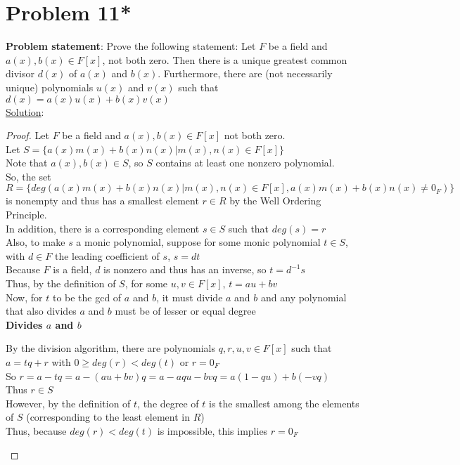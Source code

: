 \documentclass{article} %
\begin{document}
\section*{Problem 11*}
\textbf{Problem statement}: Prove the following statement: Let $F$ be a field and $a(x),b(x) \in F[x]$, not both zero.  Then there is a unique greatest common divisor $d(x)$ of $a(x)$ and $b(x)$.  Furthermore, there are (not necessarily unique) polynomials $u(x)$ and $v(x)$ such that $d(x) = a(x)u(x) + b(x)v(x)$
\\

\underline{Solution}: 
\begin{addmargin}[1em]{0em}
\begin{proof}
Let $F$ be a field and $a(x),b(x) \in F[x]$ not both zero.
\\Let $S = \{a(x)m(x) + b(x)n(x) | m(x),n(x) \in F[x]\}$
\\Note that $a(x), b(x) \in S$, so $S$ contains at least one nonzero polynomial.
\\So, the set $R = \{deg(a(x)m(x) + b(x)n(x) | m(x),n(x) \in F[x], a(x)m(x) + b(x)n(x) \neq 0_F)\}$ is nonempty and thus has a smallest element $r \in R$ by the Well Ordering Principle.
\\In addition, there is a corresponding element $s \in S$ such that $deg(s) = r$
\\Also, to make $s$ a monic polynomial, suppose for some monic polynomial $t \in S$, with $d \in F$ the leading coefficient of $s$, $s = dt$
\\Because $F$ is a field, $d$ is nonzero and thus has an inverse, so $t = d^{-1}s$
\\Thus, by the definition of $S$, for some $u, v \in F[x]$, $t = au + bv$
\\Now, for $t$ to be the gcd of $a$ and $b$, it must divide $a$ and $b$ and any polynomial that also divides $a$ and $b$ must be of lesser or equal degree
\\ \textbf{Divides $a$ and $b$}
\begin{addmargin}[1em]{0em}
By the division algorithm, there are polynomials $q, r, u, v \in F[x]$ such that $a = tq + r$ with $0 \geq deg(r) < deg(t)$ or $r = 0_F$
\\So $r = a - tq = a - (au + bv)q = a - aqu - bvq = a(1-qu) + b(-vq)$
\\Thus $r \in S$
\\However, by the definition of $t$, the degree of $t$ is the smallest among the elements of $S$ (corresponding to the least element in $R$)
\\Thus, because $deg(r) < deg(t)$ is impossible, this implies $r = 0_F$

\end{addmargin}
\end{proof}
\end{addmargin}
\end{document}

